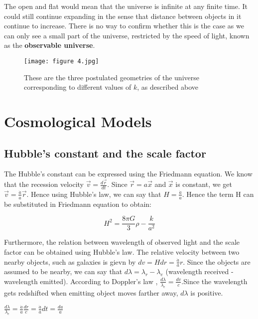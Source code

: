 \documentclass{article}
\begin{document}
The open and flat would mean that the universe is infinite at any finite time. It could still continue expanding in the sense that distance between objects in it continue to increase. There is no way to confirm whether this is the case as we can only see a small part of the universe, restricted by the speed of light, known as the \textbf{observable universe}.

\begin{figure}[H]
    \centering
    \texttt{[image: figure 4.jpg]}
    \caption{These are the three postulated geometries of the universe corresponding to different values of $k$, as described above}
    \label{fig:matrad}
\end{figure}

\section{Cosmological Models}
\subsection{Hubble's constant and the scale factor}

The Hubble's constant can be expressed using the Friedmann equation. We know that the recession velocity $ \vec{v} = \frac{d\vec{r}}{dt} $. Since $ \vec{r}=a\vec{x} $ and $ \vec{x}$ is constant, we get $ \vec{v} = \frac{\dot{a}}{a}\vec{r} $. Hence using Hubble's law, we can say that $ H=\frac{\dot{a}}{a} $. Hence the term H can be substituted in Friedmann equation to obtain:

\begin{equation}
    H^2 = \frac{8{\pi}G}{3}\rho - \frac{k}{a^2}
\end{equation}

Furthermore, the relation between wavelength of observed light and the scale factor can be obtained using Hubble's law. The relative velocity between two nearby objects, such as galaxies is gievn by $dv = Hdr = \frac{\dot{a}}{a}r$. Since the objects are assumed to be nearby, we can say that $d\lambda = \lambda_{r}-\lambda_{e}$ (wavelength received - wavelength emitted). According to Doppler's law , $\frac{d\lambda}{\lambda_{e}} = \frac{dv}{c}$.Since the wavelength gets redshifted when emitting object moves farther away, ${d\lambda}$ is positive.

\begin{center}
\begin{math}
    \frac{d\lambda}{\lambda_{e}} = \frac{\dot{a}}{a}\frac{dr}{c} = \frac{\dot{a}}{a}dt = \frac{da}{a}
\end{math}
\end{center}
\end{document}
